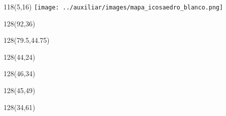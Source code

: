 \documentclass[shownotes]{beamer}
\begin{document}
\begin{frame}[plain]

 \begin{textblock}{118}(5,16)
 \texttt{[image: ../auxiliar/images/mapa\_icosaedro\_blanco.png]} 
 \end{textblock}

 \begin{textblock}{128}(92,36)
  \tikz{%
    \node[latent, fill=red,minimum size=0.15cm] () {};
  }
 \end{textblock}

 \begin{textblock}{128}(79.5,44.75)
  \tikz{%
    \node[latent, fill=red,minimum size=0.15cm] () {};
  }
 \end{textblock}

 \begin{textblock}{128}(44,24)
  \tikz{%
    \node[latent, fill=red,minimum size=0.15cm] () {};
  }
 \end{textblock}

 \begin{textblock}{128}(46,34)
  \tikz{%
    \node[latent, fill=red,minimum size=0.15cm] () {};
  }
 \end{textblock}

 \begin{textblock}{128}(45,49)
  \tikz{%
    \node[latent, fill=red,minimum size=0.15cm] () {};
  }
 \end{textblock}
% 

 \begin{textblock}{128}(34,61)
  \tikz{%
    \node[latent, fill=red,minimum size=0.15cm] () {};
  }
 \end{textblock}

 \end{frame}
\end{document}
